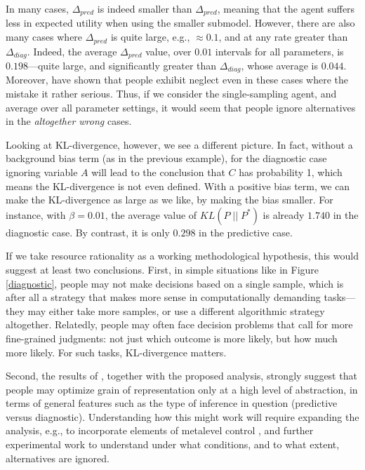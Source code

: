 \documentclass[10pt,letterpaper]{article}
\begin{document}
In many cases, $\Delta_{pred}$ is indeed smaller than $\Delta_{pred}$, meaning that the agent suffers less in expected utility when using the smaller submodel. However, there are also many cases where $\Delta_{pred}$ is quite large, e.g., $\approx 0.1$, and at any rate greater than $\Delta_{diag}$. Indeed, the average $\Delta_{pred}$ value, over $0.01$ intervals for all parameters, is $0.198$---quite large, and significantly greater than $\Delta_{diag}$, whose average is $0.044$. Moreover, \cite{Fernbach2013} have shown that people exhibit neglect even in these cases where the mistake it rather serious. Thus, if we consider the single-sampling agent, and average over all parameter settings, it would seem that people ignore alternatives in the \emph{altogether wrong} cases.

Looking at KL-divergence, however, we see a different picture. In fact, without a background bias term (as in the previous example), for the diagnostic case ignoring variable $A$ will lead to the conclusion that $C$ has probability 1, which means the KL-divergence is not even defined. With a positive bias term, we can make the KL-divergence as large as we like, by making the bias smaller. For instance, with $\beta = 0.01$, the average value of $KL(P\;||\;P^*)$ is already $1.740$ in the diagnostic case. By contrast, it is only $0.298$ in the predictive case. 

If we take resource rationality as a working methodological hypothesis, this would suggest at least two conclusions. First, in simple situations like in Figure \ref{diagnostic}, people may not make decisions based on a single sample, which is after all a strategy that makes more sense in computationally demanding tasks---they may either take more samples, or use a different algorithmic strategy altogether. Relatedly, people may often face decision problems that call for more fine-grained judgments: not just which outcome is more likely, but how much more likely. For such tasks, KL-divergence matters.

Second, the results of \cite{Fernbach2011}, together with the proposed analysis, strongly suggest that people may optimize grain of representation only at a high level of abstraction, in terms of general features such as the type of inference in question (predictive versus diagnostic). Understanding how this might work will require expanding the analysis, e.g., to incorporate elements of metalevel control \citep{Icard2014,Lieder2014}, and further experimental work to understand under what conditions, and to what extent, alternatives are ignored.
\end{document}
